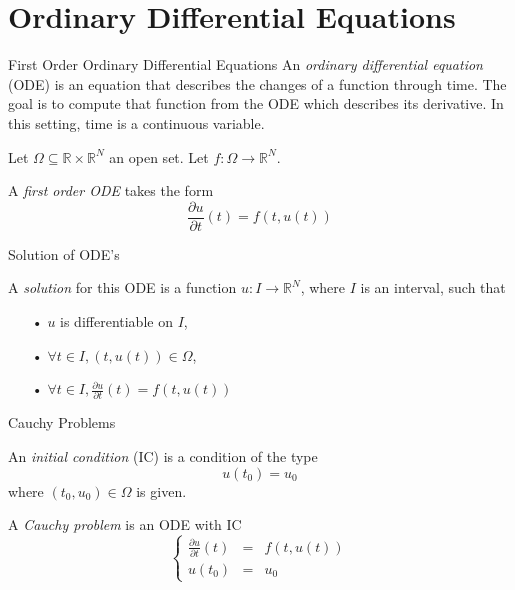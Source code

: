 \documentclass[11pt]{beamer}
\begin{document}
\section{Ordinary Differential Equations}
\begin{frame}{First Order Ordinary Differential Equations}
An\textit{ ordinary differential equation} (ODE) \cite{9} is an equation that describes the changes of a function through time. The goal is to compute that function from the ODE which describes its derivative. In this setting, time is a continuous variable.

\begin{definition}
Let $\Omega \subseteq \mathbb{R} \times \mathbb{R}^N$ an open set. Let $f: \Omega \rightarrow \mathbb{R}^N$. 

A \textit{first order ODE} takes the form
$$
\frac{\partial u}{\partial t}(t) = f(t,u(t))
$$
\end{definition}
\end{frame}

\begin{frame}{Solution of ODE's}
\begin{definition}
A \textit{solution} for this ODE is a function $u : I \rightarrow \mathbb{R}^N$, where $I$ is an interval, such that
	\begin{itemize}
	\item[•] $u$ is differentiable on $I$,
	\item[•] $\forall t \in I, (t, u(t)) \in \Omega$,
	\item[•] $\forall t \in I, \frac{\partial u}{\partial t}(t) = f(t, u(t))$
	\end{itemize}
\end{definition}
\end{frame}

\begin{frame}{Cauchy Problems}

\begin{definition}
An \textit{initial condition} (IC) is a condition of the type
$$
u(t_0) = u_0
$$
where $(t_0, u_0) \in \Omega$ is given.
\end{definition}

\begin{definition}
A \textit{Cauchy problem} is an ODE with IC
$$
\left \{
\begin{array}{rcl}
\frac{\partial u}{\partial t}(t) & = & f(t, u(t)) \\
u(t_0) & = & u_0
\end{array}
\right.
$$
\end{definition}
\end{frame}
\end{document}
